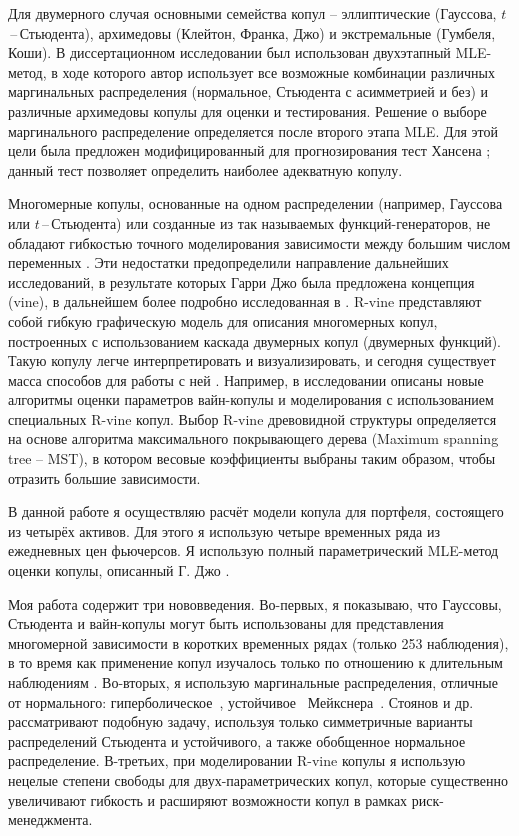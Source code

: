 Для двумерного случая основными семейства копул -- эллиптические (Гауссова, $t$\,--\,Стьюдента), архимедовы (Клейтон, Франка, Джо) и экстремальные (Гумбеля, Коши).
В диссертационном исследовании \cite{Xu2008} был использован двухэтапный MLE-метод, в ходе которого автор использует все возможные комбинации различных маргинальных распределения (нормальное, Стьюдента с асимметрией и без) и различные архимедовы копулы для оценки и тестирования. 
Решение о выборе маргинального распределение определяется после второго этапа MLE. 
Для этой цели была предложен модифицированный для прогнозирования тест Хансена \cite{Hansen2005}; данный тест позволяет определить наиболее адекватную копулу.

Многомерные копулы, основанные на одном распределении (например, Гауссова или $t$\,--\,Стьюдента) или созданные из так называемых функций-генераторов, не обладают гибкостью точного моделирования зависимости между большим числом переменных \cite{Brechmann2013}. Эти недостатки предопределили направление дальнейших исследований, в результате которых Гарри Джо \cite{Joe1996} была предложена концепция  (vine), в дальнейшем более подробно исследованная в \cite{Brechmann2013, Cooke2015}.
R-vine представляют собой гибкую графическую модель для описания многомерных копул, построенных с использованием каскада двумерных копул (двумерных функций). 
Такую копулу легче интерпретировать и визуализировать, и сегодня существует масса способов для работы с ней \cite{Cooke2015, Czado2010, Dissmann2013}.
Например, в исследовании \cite{Dissmann2013} описаны новые алгоритмы оценки параметров вайн-копулы и моделирования с использованием специальных R-vine копул.
Выбор R-vine древовидной структуры определяется на основе алгоритма максимального покрывающего дерева (Maximum spanning tree -- MST), в котором весовые коэффициенты выбраны таким образом, чтобы отразить большие зависимости.

В данной работе я осуществляю расчёт модели копула для портфеля, состоящего из четырёх активов. Для этого я использую четыре временных ряда из ежедневных цен фьючерсов. Я использую полный параметрический MLE-метод оценки копулы, описанный Г. Джо \cite{Joe1997, Joe2014}.

Моя работа содержит три нововведения. 
Во-первых, я показываю, что Гауссовы, Стьюдента и вайн-копулы могут быть использованы для представления многомерной зависимости в коротких временных рядах (только 253 наблюдения), в то время как применение копул изучалось только по отношению к длительным наблюдениям \cite{Dissmann2013, Kole2007, Lourme2016}.
Во-вторых, я использую маргинальные распределения, отличные от нормального: гиперболическое~\cite{Barndoff1983}, устойчивое~\cite{Rachev2005} Мейкснера~\cite{Schoutens2002}. 
Стоянов и др.~\cite{Stoyanov2013} рассматривают подобную задачу, используя только симметричные варианты распределений Стьюдента и устойчивого, а также обобщенное нормальное распределение. 
В-третьих, при моделировании R-vine копулы я использую 
нецелые степени свободы для двух-параметрических копул, которые существенно увеличивают гибкость и расширяют возможности копул в рамках риск-менеджмента.

